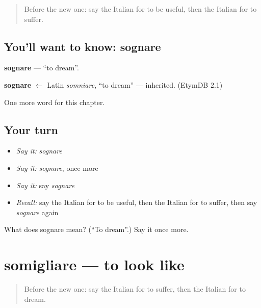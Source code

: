 \label{lesson:IT-C211-sognare}



\begin{quote}
Before the new one: say the Italian for to be useful, then the Italian for to suffer.
\end{quote}

\subsection*{You'll want to know: sognare}
\textbf{sognare} — \textquotedblleft{}to dream\textquotedblright{}.

\begin{cousinweb}
\textbf{sognare} $\leftarrow$ Latin \emph{somniare}, \textquotedblleft{}to dream\textquotedblright{} — inherited. (EtymDB 2.1)
\end{cousinweb}

\begin{grammarlens}[title={What you've built}]
One more word for this chapter.
\end{grammarlens}

\subsection*{Your turn}
\begin{itemize}
\raggedright
  \item \emph{Say it:} \emph{sognare}
  \item \emph{Say it:} \emph{sognare}, once more
  \item \emph{Say it:} say \emph{sognare}
  \item \emph{Recall:} say the Italian for to be useful, then the Italian for to suffer, then say \emph{sognare} again
\end{itemize}

\begin{tcolorbox}[breakable,colback=teal!4,colframe=teal!35!black,title={Before you move on}]
What does sognare mean? (\textquotedblleft{}To dream\textquotedblright{}.) Say it once more.
\end{tcolorbox}
\section[somigliare]{somigliare — to look like}

\label{lesson:IT-C211-somigliare}



\begin{quote}
Before the new one: say the Italian for to suffer, then the Italian for to dream.
\end{quote}

